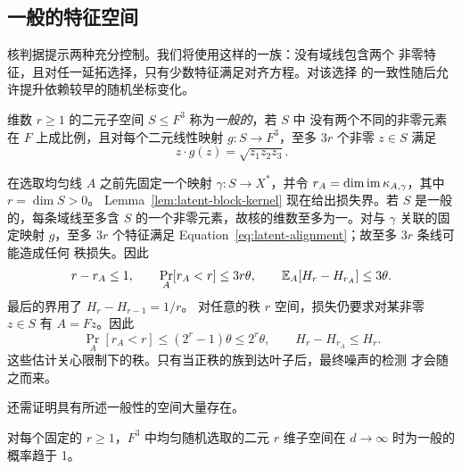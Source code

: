 \subsection{一般的特征空间}

核判据提示两种充分控制。我们将使用这样的一族：没有域线包含两个
非零特征，且对任一延拓选择，只有少数特征满足对齐方程。对该选择
的一致性随后允许提升依赖较早的随机坐标变化。

\begin{definition}
维数 $r\ge1$ 的二元子空间 $S\le F^3$ 称为\emph{一般的}，若 $S$ 中
没有两个不同的非零元素在 $F$ 上成比例，且对每个二元线性映射
$g:S\to F^3$，至多 $3r$ 个非零 $z\in S$ 满足
\begin{equation}\label{eq:latent-alignment}
 z\cdot g(z)=\sqrt{z_1z_2z_3}.
\end{equation}
\end{definition}

在选取均匀线 $A$ 之前先固定一个映射 $\gamma:S\to X^*$，并令
$r_A=\dim\operatorname{im}\kappa_{A,\gamma}$，其中 $r=\dim S>0$。
Lemma~\ref{lem:latent-block-kernel} 现在给出损失界。若 $S$ 是一般
的，每条域线至多含 $S$ 的一个非零元素，故核的维数至多为一。对与
$\gamma$ 关联的固定映射 $g$，至多 $3r$ 个特征满足
Equation~\eqref{eq:latent-alignment}；故至多 $3r$ 条线可能造成任何
秩损失。因此
\begin{equation}\label{eq:latent-generic-rank-loss}
 r-r_A\le1,\qquad
 \Pr_A[r_A<r]\le3r\theta,\qquad
 \mathbb E_A[H_r-H_{r_A}]\le3\theta.
\end{equation}
最后的界用了 $H_r-H_{r-1}=1/r$。
对任意的秩 $r$ 空间，损失仍要求对某非零 $z\in S$ 有 $A=Fz$。因此
\begin{equation}\label{eq:latent-arbitrary-rank-loss}
 \Pr_A[r_A<r]\le(2^r-1)\theta\le2^r\theta,
 \qquad H_r-H_{r_A}\le H_r.
\end{equation}
这些估计关心限制下的秩。只有当正秩的族到达叶子后，最终噪声的检测
才会随之而来。

还需证明具有所述一般性的空间大量存在。

\begin{lemma}\label{lem:latent-generic}
对每个固定的 $r\ge1$，$F^3$ 中均匀随机选取的二元 $r$ 维子空间在
$d\to\infty$ 时为一般的概率趋于 1。
\end{lemma}

